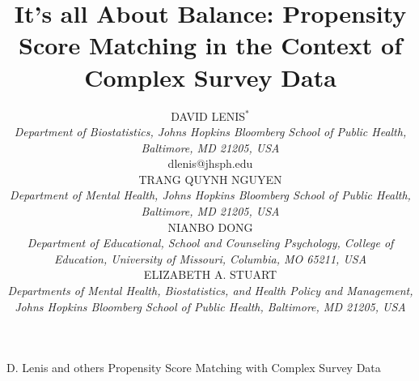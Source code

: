 \documentclass[oupdraft]{bio}
\begin{document}
\title{It's all About Balance: Propensity Score Matching in the Context of Complex Survey Data}

\author{DAVID LENIS$^\ast$\\
\textit{Department of Biostatistics, Johns Hopkins Bloomberg School of Public Health, Baltimore, MD 21205, USA}\\
{dlenis@jhsph.edu}\\
TRANG QUYNH NGUYEN\\
\textit{Department of Mental Health, Johns Hopkins Bloomberg School of Public Health, Baltimore, MD 21205, USA}\\
NIANBO DONG\\
\textit{Department of Educational, School and Counseling Psychology, College of Education, University of Missouri, Columbia, MO 65211, USA}\\
ELIZABETH A. STUART\\
\textit{Departments of Mental Health, Biostatistics, and Health Policy and Management, Johns Hopkins Bloomberg School of Public Health, Baltimore, MD 21205, USA}}

\markboth%
{D. Lenis and others}
{Propensity Score Matching with Complex Survey Data}
\maketitle

\end{document}

